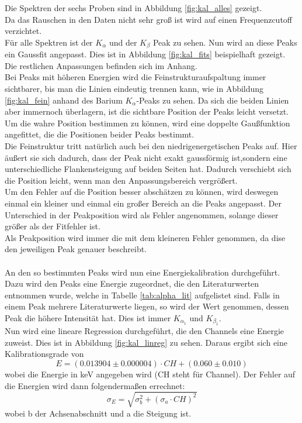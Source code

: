 \documentclass[12pt,a4paper]{article}
\begin{document}
Die Spektren der sechs Proben sind in Abbildung \ref{fig:kal_alles} gezeigt.\\
Da das Rauschen in den Daten nicht sehr groß ist wird auf einen Frequenzcutoff verzichtet.\\
Für alle Spektren ist der $K_{\alpha}$ und der $K_{\beta}$ Peak zu sehen.
Nun wird an diese Peaks ein Gaussfit angepasst. Dies ist in Abbildung \ref{fig:kal_fits} beispielhaft gezeigt. Die restlichen Anpassungen befinden sich im Anhang.\\
Bei Peaks mit höheren Energien wird die Feinstrukturaufspaltung immer sichtbarer, bis man die Linien eindeutig trennen kann, wie in Abbildung \ref{fig:kal_fein} anhand des Barium $K_{\alpha}$-Peaks zu sehen. Da sich die beiden Linien aber immernoch überlagern, ist die sichtbare Position der Peaks leicht versetzt. Um die wahre Position bestimmen zu können, wird eine doppelte Gaußfunktion angefittet, die die Positionen beider Peaks bestimmt.\\
Die Feinstruktur tritt natürlich auch bei den niedrigenergetischen Peaks auf. Hier äußert sie sich dadurch, dass der Peak nicht exakt gaussförmig ist,sondern eine unterschiedliche Flankensteigung auf beiden Seiten hat. Dadurch verschiebt sich die Position leicht, wenn man den Anpassungsbereich vergrößert.\\
Um den Fehler auf die Position besser abschätzen zu können, wird deswegen einmal ein kleiner und einmal ein großer Bereich an die Peaks angepasst. Der Unterschied in der Peakposition wird als Fehler angenommen, solange dieser größer als der Fitfehler ist.\\
Als Peakposition wird immer die mit dem kleineren Fehler genommen, da dise den jeweiligen Peak genauer beschreibt.\\
\\
An den so bestimmten Peaks wird nun eine Energiekalibration durchgeführt. Dazu wird den Peaks eine Energie zugeordnet, die den Literaturwerten entnommen wurde, welche in Tabelle \ref{tab:alpha_lit} aufgelistet sind. Falls in einem Peak mehrere Literaturwerte liegen, so wird der Wert genommen, dessen Peak die höhere Intensität hat. Dies ist immer $K_{\alpha_1}$ und $K_{\beta_{1}}$.\\
Nun wird eine lineare Regression durchgeführt, die den Channels eine Energie zuweist. Dies ist in Abbildung \ref{fig:kal_linreg} zu sehen. Daraus ergibt sich eine Kalibrationsgrade von
\begin{equation}
E = (0.013904\pm0.000004)\cdot CH + (0.060\pm0.010)
\end{equation}
wobei die Energie in keV angegeben wird (CH steht für Channel). Der Fehler auf die Energien wird dann folgendermaßen errechnet:
\begin{equation}
\sigma_E = \sqrt{\sigma_b^2+(\sigma_a\cdot CH)^2}
\end{equation}
wobei b der Achsenabschnitt und a die Steigung ist.
\end{document}

